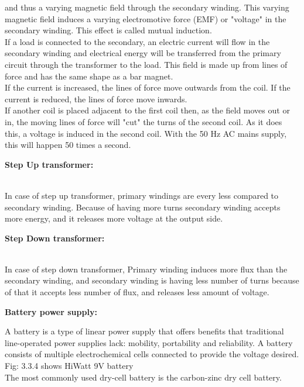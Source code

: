 \documentclass[a4paper,12pt, English]{article}
\begin{document}
\begin{normalsize}
and thus a varying magnetic field through the secondary winding. This varying magnetic field
induces a varying electromotive force (EMF) or "voltage" in the secondary winding. This effect
is called mutual induction.\\
If a load is connected to the secondary, an electric current will flow in the
secondary winding and electrical energy will be transferred from the primary circuit through
the transformer to the load. This field is made up from lines of force and has the same shape as
a bar magnet.\\
If the current is increased, the lines of force move outwards from the coil. If
the current is reduced, the lines of force move inwards.\\
If another coil is placed adjacent to the first coil then, as the field moves out or
in, the moving lines of force will "cut" the turns of the second coil. As it does this, a voltage
is induced in the second coil. With the 50 Hz AC mains supply, this will happen 50 times a
second.
\newline
\begin{large}
\textbf{Step Up transformer:}
\end{large}\\
In case of step up transformer, primary windings are every less compared to
secondary winding.
Because of having more turns secondary winding accepts more energy, and it
releases more voltage at the output side.\\
\begin{large}
\textbf{Step Down transformer:}
\end{large}\\
In case of step down transformer, Primary winding induces more flux than the
secondary winding, and secondary winding is having less number of turns because of that it
accepts less number of flux, and releases less amount of voltage.
\\
\newline
\begin{large}
\textbf{Battery power supply:}
\end{large}
\newline
A battery is a type of linear power supply that offers benefits that traditional
line-operated power supplies lack: mobility, portability and reliability. A battery consists of
multiple electrochemical cells connected to provide the voltage desired. Fig: 3.3.4 shows HiWatt 9V battery\\
The most commonly used dry-cell battery is the carbon-zinc dry cell battery.

\end{normalsize}
\end{document}
